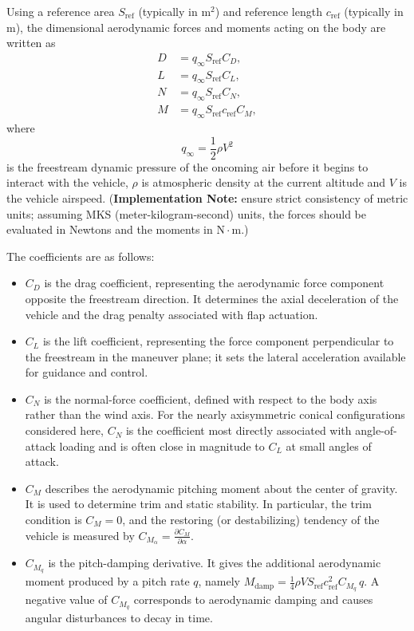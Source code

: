 Using a reference area \(S_{\mathrm{ref}}\) (typically in \(\mathrm{m}^2\)) and reference length \(c_{\mathrm{ref}}\) (typically in \(\mathrm{m}\)), the dimensional aerodynamic forces and moments acting on the body are written as
\begin{align}
D &= q_\infty S_{\mathrm{ref}} C_D, \label{eq:drag_force} \\
L &= q_\infty S_{\mathrm{ref}} C_L, \label{eq:lift_force} \\
N &= q_\infty S_{\mathrm{ref}} C_N, \label{eq:normal_force} \\
M &= q_\infty S_{\mathrm{ref}} c_{\mathrm{ref}} C_M, \label{eq:pitch_moment}
\end{align}
where 
\begin{equation}
q_\infty = \frac{1}{2}\rho V^2 \label{eq:dynamic_pressure}
\end{equation}
is the freestream dynamic pressure of the oncoming air before it begins to interact with the vehicle, \(\rho\) is atmospheric density at the current altitude and \(V\) is the vehicle airspeed. (\textbf{Implementation Note:} ensure strict consistency of metric units; assuming MKS (meter-kilogram-second) units, the forces should be evaluated in Newtons and the moments in \(\mathrm{N\cdot m}\).)

The coefficients are as follows: 
\begin{itemize}
    \item \(C_D\) is the drag coefficient, representing the aerodynamic force component opposite the freestream direction. It determines the axial deceleration of the vehicle and the drag penalty associated with flap actuation.
    \item \(C_L\) is the lift coefficient, representing the force component perpendicular to the freestream in the maneuver plane; it sets the lateral acceleration available for guidance and control.
    \item \(C_N\) is the normal-force coefficient, defined with respect to the body axis rather than the wind axis. For the nearly axisymmetric conical configurations considered here, \(C_N\) is the coefficient most directly associated with angle-of-attack loading and is often close in magnitude to \(C_L\) at small angles of attack.
    \item \(C_M\) describes the aerodynamic pitching moment about the center of gravity. It is used to determine trim and static stability. In particular, the trim condition is \(C_M = 0\), and the restoring (or destabilizing) tendency of the vehicle is measured by \(C_{M_\alpha} = \frac{\partial C_M}{\partial \alpha}\).
    \item \(C_{M_q}\) is the pitch-damping derivative. It gives the additional aerodynamic moment produced by a pitch rate \(q\), namely \(M_{\mathrm{damp}} = \frac{1}{4}\rho V S_{\mathrm{ref}} c_{\mathrm{ref}}^2 C_{M_q}\, q\). A negative value of \(C_{M_q}\) corresponds to aerodynamic damping and causes angular disturbances to decay in time.
\end{itemize}  

